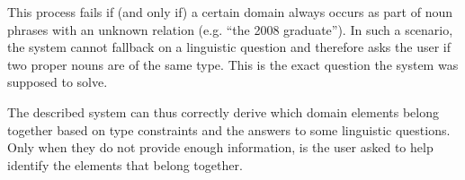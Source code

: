 This process fails if (and only if) a certain domain always occurs as part of noun phrases with an unknown relation (e.g. ``the 2008 graduate''). In such a scenario, the system cannot fallback on a linguistic question and therefore asks the user if two proper nouns are of the same type. This is the exact question the system was supposed to solve.

The described system can thus correctly derive which domain elements belong together based on type constraints and the answers to some linguistic questions. Only when they do not provide enough information, is the user asked to help identify the elements that belong together.
